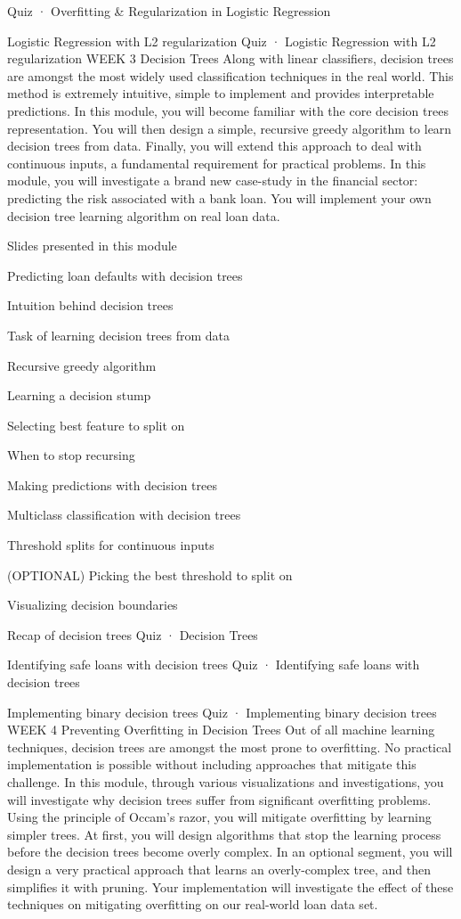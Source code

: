 Quiz · Overfitting & Regularization in Logistic Regression
\item Logistic Regression with L2 regularization
Quiz · Logistic Regression with L2 regularization
WEEK 3
Decision Trees
Along with linear classifiers, decision trees are amongst the most widely used classification techniques in the real world. This method is extremely intuitive, simple to implement and provides interpretable predictions. In this module, you will become familiar with the core decision trees representation. You will then design a simple, recursive greedy algorithm to learn decision trees from data. Finally, you will extend this approach to deal with continuous inputs, a fundamental requirement for practical problems. In this module, you will investigate a brand new case-study in the financial sector: predicting the risk associated with a bank loan. You will implement your own decision tree learning algorithm on real loan data.
\item Slides presented in this module
\item Predicting loan defaults with decision trees
\item Intuition behind decision trees
\item Task of learning decision trees from data
\item Recursive greedy algorithm
\item Learning a decision stump
\item Selecting best feature to split on
\item When to stop recursing
\item Making predictions with decision trees
\item Multiclass classification with decision trees
\item Threshold splits for continuous inputs
\item (OPTIONAL) Picking the best threshold to split on
\item Visualizing decision boundaries
\item Recap of decision trees
Quiz · Decision Trees
\item Identifying safe loans with decision trees
Quiz · Identifying safe loans with decision trees
\item Implementing binary decision trees
Quiz · Implementing binary decision trees
WEEK 4
Preventing Overfitting in Decision Trees
Out of all machine learning techniques, decision trees are amongst the most prone to overfitting. No practical implementation is possible without including approaches that mitigate this challenge. In this module, through various visualizations and investigations, you will investigate why decision trees suffer from significant overfitting problems. Using the principle of Occam's razor, you will mitigate overfitting by learning simpler trees. At first, you will design algorithms that stop the learning process before the decision trees become overly complex. In an optional segment, you will design a very practical approach that learns an overly-complex tree, and then simplifies it with pruning. Your implementation will investigate the effect of these techniques on mitigating overfitting on our real-world loan data set.
